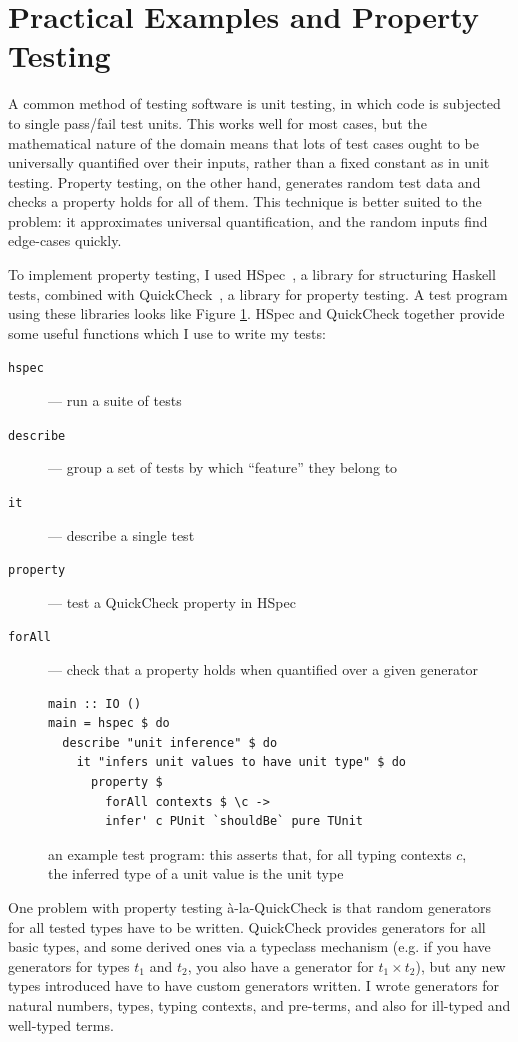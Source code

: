 \section{Practical Examples and Property Testing}
\label{sec:property-testing}
A common method of testing software is unit testing, in which code is subjected to single pass/fail test units.
This works well for most cases, but the mathematical nature of the domain means that lots of test cases ought to be universally quantified over their inputs, rather than a fixed constant as in unit testing.
Property testing, on the other hand, generates random test data and checks a property holds for all of them.
This technique is better suited to the problem: it approximates universal quantification, and the random inputs find edge-cases quickly.

To implement property testing, I used HSpec~\cite{hspec}, a library for structuring Haskell tests, combined with QuickCheck~\cite{quickcheck}, a library for property testing.
A test program using these libraries looks like Figure \ref{fig:example-test}.
HSpec and QuickCheck together provide some useful functions which I use to write my tests:
\begin{description}
\item[\texttt{hspec}] --- run a suite of tests
\item[\texttt{describe}] --- group a set of tests by which ``feature'' they belong to
\item[\texttt{it}] --- describe a single test
\item[\texttt{property}] --- test a QuickCheck property in HSpec
\item[\texttt{forAll}] --- check that a property holds when quantified over a given generator
\end{description}

\begin{figure}
\begin{verbatim}
main :: IO ()
main = hspec $ do
  describe "unit inference" $ do
    it "infers unit values to have unit type" $ do
      property $
        forAll contexts $ \c ->
        infer' c PUnit `shouldBe` pure TUnit
\end{verbatim}
\caption{an example test program: this asserts that, for all typing contexts \(c\), the inferred type of a unit value is the unit type}
\label{fig:example-test}
\end{figure}

One problem with property testing \`a-la-QuickCheck is that random generators for all tested types have to be written.
QuickCheck provides generators for all basic types, and some derived ones via a typeclass mechanism (e.g. if you have generators for types \(t_1\) and \(t_2\), you also have a generator for \(t_1 \times t_2\)), but any new types introduced have to have custom generators written.
I wrote generators for natural numbers, types, typing contexts, and pre-terms, and also for ill-typed and well-typed terms.

